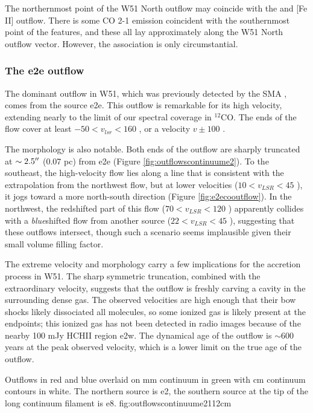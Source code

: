 \documentclass{aa}
\begin{document}
The northernmost point of the W51 North outflow may coincide with
the \citet{Hodapp2002a} \hh and [Fe II] outflow.  There is some CO 2-1
emission coincident with the southernmost point of the \hh features,
and these all lay approximately along the W51 North outflow vector.
However, the association is only circumstantial.


\subsubsection{The e2e outflow}
The dominant outflow in W51, which was previously detected by the SMA
\citep{Shi2010a,Shi2010b}, comes from the source e2e.  This outflow is
remarkable for its high velocity, extending nearly to the limit of our spectral
coverage in $^{12}$CO.  The ends of the flow cover at least $-50 < v_{lsr} <
160$ \kms, or a velocity $v\pm100$ \kms.  

The morphology is also notable.  Both ends of the outflow are sharply truncated
at $\sim2.5\mbox{$^{\prime\prime}$}$ (0.07 pc) from e2e (Figure \ref{fig:outflowscontinuume2}).
To the southeast, the high-velocity flow lies along a line that is consistent
with the extrapolation from the northwest flow, but at lower velocities ($10 <
v_{LSR} < 45$ \kms), it jogs toward a more north-south direction (Figure
\ref{fig:e2ecooutflow}).  In the
northwest, the redshifted part of this flow ($70 < v_{LSR} < 120$ \kms)
apparently collides with a \emph{blue}shifted flow from another source ($22 <
v_{LSR} < 45$ \kms), suggesting that these outflows intersect, though such a
scenario seems  implausible given their small volume filling factor.

The extreme velocity and morphology carry a few implications for the
accretion process in W51.  The sharp symmetric truncation, combined with the
extraordinary velocity, suggests that the outflow is freshly carving a cavity
in the surrounding dense gas.  The observed velocities are high enough that
their bow shocks likely dissociated all molecules, so some ionized gas is
likely present at the endpoints; this ionized gas has not been detected in
radio images because of the nearby 100 mJy HCHII region e2w.  The dynamical age
of the outflow is $\sim600$ years at the peak observed velocity, which is a
lower limit on the true age of the outflow.


{Outflows in red and blue overlaid on mm continuum in green with cm continuum
contours in white.  The northern source is e2, the southern source at the tip
of the long continuum filament is e8.}
{fig:outflowscontinuume2}{1}{12cm}
\end{document}
